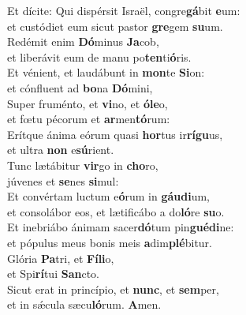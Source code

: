 \evenverse Et dícite: Qui dispérsit Israël, congre\textbf{gá}bit \textbf{e}um:~\*\\
\evenverse et custódiet eum sicut pastor \textbf{gre}gem \textbf{su}um.\\
\oddverse Redémit enim \textbf{Dó}minus \textbf{Ja}cob,~\*\\
\oddverse et liberávit eum de manu po\textbf{ten}ti\textbf{ó}ris.\\
\evenverse Et vénient, et laudábunt in \textbf{mon}te \textbf{Si}on:~\*\\
\evenverse et cónfluent ad \textbf{bo}na \textbf{Dó}mini,\\
\oddverse Super fruménto, et \textbf{vi}no, et \textbf{ó}\textbf{le}o,~\*\\
\oddverse et fœtu pécorum et \textbf{ar}men\textbf{tó}rum:\\
\evenverse Erítque ánima eórum quasi \textbf{hor}tus ir\textbf{rí}\textbf{gu}us,~\*\\
\evenverse et ultra \textbf{non} e\textbf{sú}rient.\\
\oddverse Tunc lætábitur \textbf{vir}go in \textbf{cho}ro,~\*\\
\oddverse júvenes et \textbf{se}nes \textbf{si}mul:\\
\evenverse Et convértam luctum e\textbf{ó}rum in \textbf{gáu}\textbf{di}um,~\*\\
\evenverse et consolábor eos, et lætificábo a do\textbf{ló}re \textbf{su}o.\\
\oddverse Et inebriábo ánimam sacer\textbf{dó}tum pin\textbf{gué}\textbf{di}ne:~\*\\
\oddverse et pópulus meus bonis meis \textbf{a}dim\textbf{plé}bitur.\\
\evenverse Glória \textbf{Pa}tri, et \textbf{Fí}\textbf{li}o,~\*\\
\evenverse et Spi\textbf{rí}tui \textbf{San}cto.\\
\oddverse Sicut erat in princípio, et \textbf{nunc}, et \textbf{sem}per,~\*\\
\oddverse et in sǽcula sæcu\textbf{ló}rum. \textbf{A}men.\\
